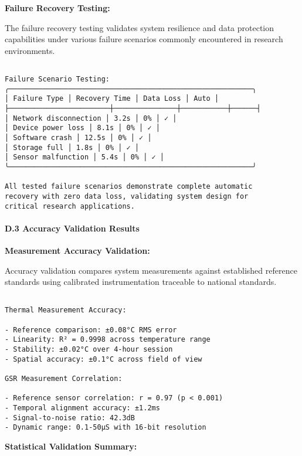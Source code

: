 \documentclass[11pt,a4paper]{report}
\begin{document}
{{\textbf{Failure Recovery Testing:}

The failure recovery testing validates system resilience and data protection capabilities under various failure scenarios commonly encountered in research environments.

\begin{verbatim}

Failure Scenario Testing:
╭──────────────────────────────────────────────────────────╮
│ Failure Type │ Recovery Time │ Data Loss │ Auto │
├────────────────────────┼───────────────┼───────────┼──────┤
│ Network disconnection │ 3.2s │ 0% │ ✓ │
│ Device power loss │ 8.1s │ 0% │ ✓ │
│ Software crash │ 12.5s │ 0% │ ✓ │
│ Storage full │ 1.8s │ 0% │ ✓ │
│ Sensor malfunction │ 5.4s │ 0% │ ✓ │
╰──────────────────────────────────────────────────────────╯

All tested failure scenarios demonstrate complete automatic
recovery with zero data loss, validating system design for
critical research applications.

\end{verbatim}

\paragraph{D.3 Accuracy Validation Results}

\textbf{Measurement Accuracy Validation:}

Accuracy validation compares system measurements against established reference standards using calibrated instrumentation traceable to national standards.

\begin{verbatim}

Thermal Measurement Accuracy:

- Reference comparison: ±0.08°C RMS error
- Linearity: R² = 0.9998 across temperature range
- Stability: ±0.02°C over 4-hour session
- Spatial accuracy: ±0.1°C across field of view

GSR Measurement Correlation:

- Reference sensor correlation: r = 0.97 (p < 0.001)
- Temporal alignment accuracy: ±1.2ms
- Signal-to-noise ratio: 42.3dB
- Dynamic range: 0.1-50μS with 16-bit resolution

\end{verbatim}

\textbf{Statistical Validation Summary:}

\begin{verbatim}


\end{verbatim}}}
\end{document}
